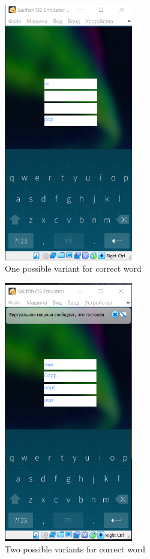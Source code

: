 \documentclass[conference]{IEEEtran}
\begin{document}
\begin{figure}[!hbt]
	\centering
	\includegraphics[width=0.5\textwidth]{images/1.png}
	\caption{One possible variant for correct word}
	\label{one}
\end{figure}


\begin{figure}[!hbt]
	\centering
	\includegraphics[width=0.5\textwidth]{images/2.png}
	\caption{Two possible variants for correct word
	}
	\label{two}
\end{figure}
\end{document}
